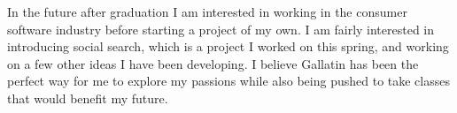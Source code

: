 \documentclass[11pt, oneside]{article}   	%
\begin{document}
\par In the future after graduation I am interested in working in the consumer software industry before starting a project of my own. I am fairly interested in introducing social search, which is a project I worked on this spring, and working on a few other ideas I have been developing. I believe Gallatin has been the perfect way for me to explore my passions while also being pushed to take classes that would benefit my future.
\end{document}
